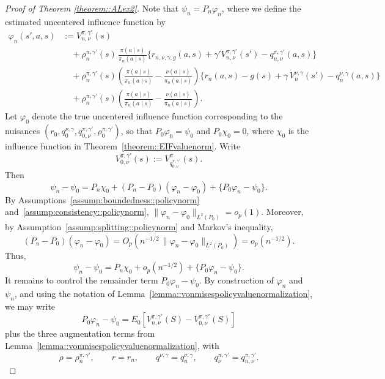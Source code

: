 \documentclass[11pt]{article}
\theoremstyle{plain}
\begin{document}
\begin{proof}[Proof of Theorem \ref{theorem::ALex2}]
Note that $\psi_n = P_n \varphi_n$, where we define the estimated uncentered influence function by
\begin{align*}
\varphi_n(s',a,s)
&:= V_{n,\nu}^{\pi,\gamma'}(s) \\
&\quad + \rho_n^{\pi,\gamma'}(s)\,
        \frac{\pi(a \mid s)}{\pi_n(a \mid s)}
        \bigl\{r_{n,\nu,\gamma,g}(a,s) + \gamma' V_{n,\nu}^{\pi,\gamma'}(s') - q_{n,\nu}^{\pi,\gamma'}(a,s)\bigr\} \\
&\quad 
    + \rho_n^{\pi,\gamma'}(s)
        \left(
            \frac{\pi(a \mid s)}{\pi_n(a \mid s)} 
            - 
            \frac{\nu(a \mid s)}{\pi_n(a \mid s)}
        \right)
        \bigl\{r_n(a,s) - g(s) + \gamma\,V_n^{\nu,\gamma}(s') - q_n^{\nu,\gamma}(a,s)\bigr\} \\
&\quad 
    + \rho_n^{\pi,\gamma'}(s)
        \left(
            \frac{\pi(a \mid s)}{\pi_n(a \mid s)} 
            - 
            \frac{\nu(a \mid s)}{\pi_n(a \mid s)}
        \right).
\end{align*}
Let $\varphi_0$ denote the true uncentered influence function corresponding to the nuisances
$(r_0, q_0^{\nu,\gamma}, q_{0,\nu}^{\pi,\gamma'}, \rho_0^{\pi,\gamma'})$, so that
$P_0 \varphi_0 = \psi_0$ and $P_0 \chi_0 = 0$, where $\chi_0$ is the influence function in Theorem~\ref{theorem::EIFvaluenorm}. Write
\[
V_{0,\nu}^{\pi,\gamma'}(s) := V_{q_{0,\nu}^{\pi,\gamma'}}^\pi(s).
\]
Then
\[
\psi_n - \psi_0
= P_n \chi_0 + (P_n - P_0)(\varphi_n - \varphi_0) + \{P_0 \varphi_n - \psi_0\}.
\]
By Assumptions~\ref{assump:boundedness::policynorm} and~\ref{assump:consistency::policynorm},
$\|\varphi_n - \varphi_0\|_{L^2(P_0)} = o_p(1)$. Moreover, by
Assumption~\ref{assump:splitting::policynorm} and Markov’s inequality,
\[
(P_n - P_0)(\varphi_n - \varphi_0)
= O_p\!\left(n^{-1/2}\,\|\varphi_n - \varphi_0\|_{L^2(P_0)}\right)
= o_p(n^{-1/2}).
\]
Thus,
\[
\psi_n - \psi_0
= P_n \chi_0 + o_p(n^{-1/2}) + \{P_0 \varphi_n - \psi_0\}.
\]
It remains to control the remainder term $P_0 \varphi_n - \psi_0$.
By construction of $\varphi_n$ and $\psi_n$, and using the notation of
Lemma~\ref{lemma::vonmisespolicyvaluenormalization}, we may write
\[
P_0 \varphi_n - \psi_0
=
E_0\!\left[V_{n,\nu}^{\pi,\gamma'}(S) - V_{0,\nu}^{\pi,\gamma'}(S)\right]
\]
plus the three augmentation terms from Lemma~\ref{lemma::vonmisespolicyvaluenormalization}, with
\[
\rho = \rho_n^{\pi,\gamma'},\qquad
r = r_n,\qquad
q^{\nu,\gamma} = q_n^{\nu,\gamma},\qquad
q_{\nu}^{\pi,\gamma'} = q_{n,\nu}^{\pi,\gamma'}.
\]
\end{proof}
\end{document}
